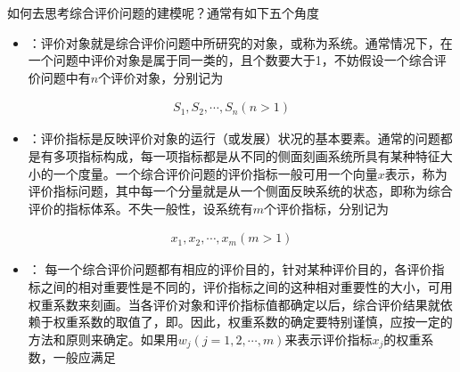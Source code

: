\documentclass[letterpaper,10pt,english]{sphinxmanual}
\begin{document}
如何去思考综合评价问题的建模呢？通常有如下五个角度
\begin{itemize}
\item {} 
：评价对象就是综合评价问题中所研究的对象，或称为系统。通常情况下，在一个问题中评价对象是属于同一类的，且个数要大于1，不妨假设一个综合评价问题中有\(n\)个评价对象，分别记为

\end{itemize}
\begin{equation*}
\begin{split}
S_{1}, S_{2}, \cdots, S_{n}(n>1)
\end{split}
\end{equation*}\begin{itemize}
\item {} 
：评价指标是反映评价对象的运行（或发展）状况的基本要素。通常的问题都是有多项指标构成，每一项指标都是从不同的侧面刻画系统所具有某种特征大小的一个度量。一个综合评价问题的评价指标一般可用一个向量\(x\)表示，称为评价指标问题，其中每一个分量就是从一个侧面反映系统的状态，即称为综合评价的指标体系。不失一般性，设系统有\(m\)个评价指标，分别记为

\end{itemize}
\begin{equation*}
\begin{split}
x_{1}, x_{2}, \cdots, x_{m}(m>1)
\end{split}
\end{equation*}\begin{itemize}
\item {} 
： 每一个综合评价问题都有相应的评价目的，针对某种评价目的，各评价指标之间的相对重要性是不同的，评价指标之间的这种相对重要性的大小，可用权重系数来刻画。当各评价对象和评价指标值都确定以后，综合评价结果就依赖于权重系数的取值了，即。因此，权重系数的确定要特别谨慎，应按一定的方法和原则来确定。如果用\(w_{j}(j=1,2, \cdots, m)\)来表示评价指标\(x_j\)的权重系数，一般应满足

\end{itemize}
\end{document}
